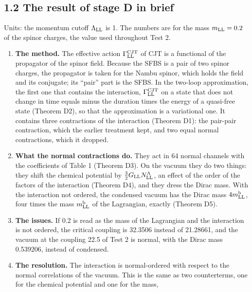 \documentclass[
  10pt,
]{article}
\providecommand{\tightlist}{%
  \setlength{\itemsep}{0pt}\setlength{\parskip}{0pt}}
\begin{document}
\hypertarget{the-result-of-stage-d-in-brief}{%
\subsection{1.2 The result of stage D in
brief}\label{the-result-of-stage-d-in-brief}}

Units: the momentum cutoff \(\Lambda_{\rm LL}\) is 1. The numbers are
for the mass \(m_{\rm LL}=0.2\) of the spinor charges, the value used
throughout Test 2.

\begin{enumerate}
\def\labelenumi{\arabic{enumi}.}
\tightlist
\item
  \textbf{The method.} The effective action
  \(\Gamma^{\rm CJT}_{\rm LL}\) of CJT is a functional of the propagator
  of the spinor field. Because the SFBS is a pair of two spinor charges,
  the propagator is taken for the Nambu spinor, which holds the field
  and its conjugate; its ``pair'' part is the SFBS. In the two-loop
  approximation, the first one that contains the interaction,
  \(\Gamma^{\rm CJT}_{\rm LL}\) on a state that does not change in time
  equals minus the duration times the energy of a quasi-free state
  (Theorem D2), so that the approximation is a variational one. It
  contains three contractions of the interaction (Theorem D1): the
  pair-pair contraction, which the earlier treatment kept, and two equal
  normal contractions, which it dropped.
\item
  \textbf{What the normal contractions do.} They act in 64 normal
  channels with the coefficients of Table 1 (Theorem D3). On the vacuum
  they do two things: they shift the chemical potential by
  \(\tfrac32G_{\rm LL}N^\Lambda_{\rm LL}\), an effect of the order of
  the factors of the interaction (Theorem D4), and they dress the Dirac
  mass. With the interaction not ordered, the condensed vacuum has the
  Dirac mass \(4m^{\rm b}_{\rm LL}\), four times the mass
  \(m^{\rm b}_{\rm LL}\) of the Lagrangian, exactly (Theorem D5).
\item
  \textbf{The issues.} If 0.2 is read as the mass of the Lagrangian and
  the interaction is not ordered, the critical coupling is 32.3506
  instead of 21.28661, and the vacuum at the coupling 22.5 of Test 2 is
  normal, with the Dirac mass 0.539206, instead of condensed.
\item
  \textbf{The resolution.} The interaction is normal-ordered with
  respect to the normal correlations of the vacuum. This is the same as
  two counterterms, one for the chemical potential and one for the mass,

\end{enumerate}
\end{document}
